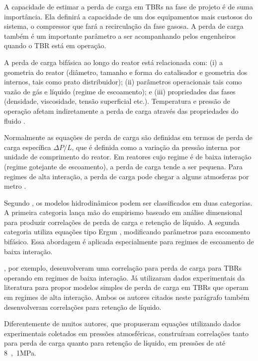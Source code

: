A capacidade de estimar a perda de carga em TBRs na fase de projeto é de suma
importância. Ela definirá a capacidade de um dos equipamentos mais custosos do
sistema, o compressor que fará a recirculação da fase gasosa. A perda de carga
também é um importante parâmetro a ser acompanhando pelos engenheiros quando o
TBR está em operação.

A perda de carga bifásica ao longo do reator está relacionada com: (i) a
geometria do reator (diâmetro, tamanho e forma do catalisador e geometria dos
internos, tais como prato distribuidor); (ii) parâmetros operacionais tais como
vazão de gás e líquido (regime de escoamento); e (iii) propriedades das fases
(densidade, viscosidade, tensão superficial etc.). Temperatura e pressão de operação afetam
indiretamente a perda de carga através das propriedades do fluido
\cite{Ranade2011}.

Normalmente as equações de perda de carga são definidas em termos de perda de
carga específica $\Delta P/L$, que é definida como a variação da pressão interna
por unidade de comprimento do reator. Em reatores cujo regime é de baixa
interação (regime gotejante de escoamento), a perda de carga tende a ser
pequena. Para regimes de alta interação, a perda de carga pode chegar a alguns
atmosferas por metro \cite{Benkrid1997}.


Segundo , os modelos hidrodinâmicos podem ser
classificados em duas categorias. A primeira categoria lança mão do empirismo
baseado em análise dimensional para produzir correlações de perda de carga e
retenção de líquido. A segunda categoria utiliza equações tipo Ergun
, modificando parâmetros para escoamento bifásico.
Essa abordagem é aplicada especialmente para regimes de escoamento de baixa
interação.

, por exemplo, desenvolveram uma correlação para perda
de carga para TBRs operando em regimes de baixa interação. Já
 utilizaram dados experimentais  da literatura para
propor modelos simples de perda de carga em TBRs que operam em regimes de alta
interação. Ambos os autores citados neste parágrafo também desenvolveram
correlações para retenção de líquido.

Diferentemente de muitos autores, que propuseram equações utilizando dados
experimentais coletados em pressões atmosféricas, 
construíram correlações tanto para perda de carga quanto para retenção de
líquido, em pressões de até \si{8,1}{MPa}.

